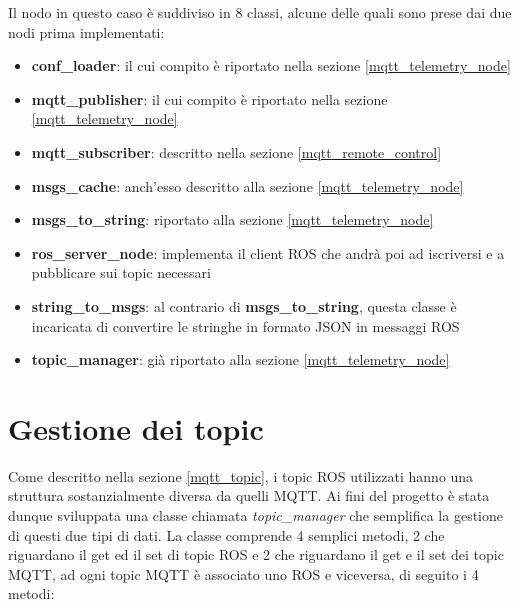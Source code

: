 \noindent Il nodo in questo caso è suddiviso in 8 classi, alcune delle quali sono prese dai due nodi prima implementati:

\begin{itemize}
  \item \textbf{conf\_loader}: il cui compito è riportato nella sezione \ref{mqtt_telemetry_node}
  \item \textbf{mqtt\_publisher}: il cui compito è riportato nella sezione \ref{mqtt_telemetry_node}
  \item \textbf{mqtt\_subscriber}: descritto nella sezione \ref{mqtt_remote_control}
  \item \textbf{msgs\_cache}: anch'esso descritto alla sezione \ref{mqtt_telemetry_node}
  \item \textbf{msgs\_to\_string}: riportato alla sezione \ref{mqtt_telemetry_node}
  \item \textbf{ros\_server\_node}: implementa il client ROS che andrà poi ad iscriversi e a pubblicare sui topic necessari
  \item \textbf{string\_to\_msgs}: al contrario di \textbf{msgs\_to\_string}, questa classe è incaricata di convertire le stringhe in formato JSON in messaggi ROS
  \item \textbf{topic\_manager}: già riportato alla sezione \ref{mqtt_telemetry_node}
\end{itemize}

\section{Gestione dei topic} \label{gestione_dei_topic}
Come descritto nella sezione \ref{mqtt_topic}, i topic ROS utilizzati hanno una struttura sostanzialmente diversa da quelli MQTT. Ai fini del progetto è stata dunque sviluppata una classe chiamata \textit{topic\_manager} che semplifica la gestione di questi due tipi di dati. La classe comprende 4 semplici metodi, 2 che riguardano il get ed il set di topic ROS e 2 che riguardano il get e il set dei topic MQTT, ad ogni topic MQTT è associato uno ROS e viceversa, di seguito i 4 metodi:

